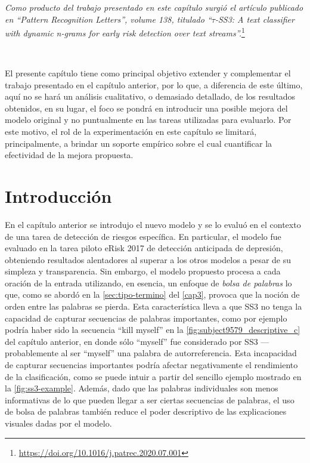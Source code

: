 \emph{Como producto del trabajo presentado en este capítulo surgió el artículo publicado en ``Pattern Recognition Letters'', volume 138, titulado ``$\tau$-SS3: A text classifier with dynamic n-grams for early risk detection over text streams''.}\footnote{\url{https://doi.org/10.1016/j.patrec.2020.07.001}}

\

El presente capítulo tiene como principal objetivo extender y complementar el trabajo presentado en el capítulo anterior, por lo que, a diferencia de este último, aquí no se hará un análisis cualitativo, o demasiado detallado, de los resultados obtenidos, en su lugar, el foco se pondrá en introducir una posible mejora del modelo original y no puntualmente en las tareas utilizadas para evaluarlo. Por este motivo, el rol de la experimentación en este capítulo se limitará, principalmente, a brindar un soporte empírico sobre el cual cuantificar la efectividad de la mejora propuesta.

\section{Introducción}


En el capítulo anterior se introdujo el nuevo modelo y se lo evaluó en el contexto de una tarea de detección de riesgos específica.
En particular, el modelo fue evaluado en la tarea piloto eRisk 2017 de detección anticipada de depresión, obteniendo resultados alentadores al superar a los otros modelos a pesar de su simpleza y transparencia.
Sin embargo, el modelo propuesto procesa a cada oración de la entrada utilizando, en esencia, un enfoque de \emph{bolsa de palabras} lo que, como se abordó en la \autoref{sec:tipo-termino} del \autoref{cap3}, provoca que la noción de orden entre las palabras se pierda.
Esta característica lleva a que SS3 no tenga la capacidad de capturar secuencias de palabras importantes, como por ejemplo podría haber sido la secuencia ``kill myself'' en la \autoref{fig:subject9579_descriptive_c} del capítulo anterior, en donde sólo ``myself'' fue considerado por SS3 ---probablemente al ser ``myself'' una palabra de autorreferencia.
Esta incapacidad de capturar secuencias importantes podría afectar negativamente el rendimiento de la clasificación, como se puede intuir a partir del sencillo ejemplo mostrado en la \autoref{fig:ss3-example}.
Además, dado que las palabras individuales son menos informativas de lo que pueden llegar a ser ciertas secuencias de palabras, el uso de bolsa de palabras también reduce el poder descriptivo de las explicaciones visuales dadas por el modelo.

